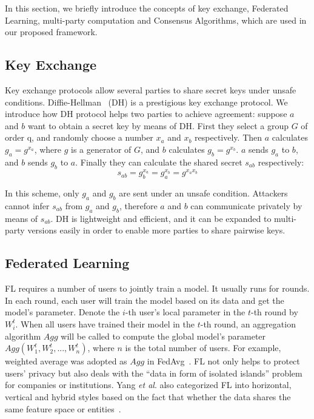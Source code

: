 In this section, we briefly introduce the concepts of key exchange, Federated Learning, multi-party computation and Consensus Algorithms, which are used in our proposed framework.

\subsection{Key Exchange}
Key exchange protocols allow several parties to share secret keys under unsafe conditions. Diffie-Hellman~\cite{DH} (DH) is a prestigious key exchange protocol. We introduce how DH protocol helps two parties to achieve agreement: suppose $a$ and $b$ want to obtain a secret key by means of DH. First they select a group $G$ of order q, and randomly choose a number $x_a$ and $x_b$ respectively. Then $a$ calculates $g_a = g^{x_a}$, where $g$ is a generator of $G$, and $b$ calculates $g_b = g^{x_b}$. $a$ sends $g_a$ to $b$, and $b$ sends $g_b$ to $a$. Finally they can calculate the shared secret $s_{ab}$ respectively:
$$ s_{ab} = g_b^{x_a}  = g_a^{x_b} = g^{x_ax_b}$$

In this scheme, only $g_a$ and $g_b$ are sent under an unsafe condition. Attackers cannot infer $s_{ab}$ from $g_a$ and $g_b$, therefore $a$ and $b$ can communicate privately by means of $s_{ab}$. DH is lightweight and efficient, and it can be expanded to multi-party versions easily in order to enable more parties to share pairwise keys.


\subsection{Federated Learning}

FL requires a number of users to jointly train a model. It usually runs for rounds. In each round, each user will train the model based on its data and get the model's parameter. Denote the $i$-th user's local parameter in the $t$-th round by $W_i^t$. When all users have trained their model in the $t$-th round, an aggregation algorithm $Agg$ will be called to compute the global model's parameter $Agg(W_1^t, W_2^t, ..., W_n^t)$, where $n$ is the total number of users. For example, weighted average was adopted as $Agg$ in FedAvg~\cite{mcmahan2016communicationefficient}. FL not only helps to protect users' privacy but also deals with the ``data in form of isolated islands'' problem for companies or institutions. Yang \emph{et al}. also categorized FL into horizontal, vertical and hybrid styles based on the fact that whether the data shares the same feature space or entities~\cite{yang2019federated}. 

